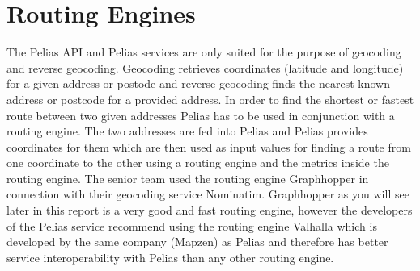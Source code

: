 
\section{Routing Engines}
The Pelias API and Pelias services are only suited for the purpose of geocoding and reverse geocoding. Geocoding retrieves coordinates (latitude and longitude) for a given address or postode and reverse geocoding finds the nearest known address or postcode for a provided address.
In order to find the shortest or fastest route between two given addresses Pelias has to be used in conjunction with a routing engine. The two addresses are fed into Pelias and Pelias provides coordinates for them which are then used as input values for finding a route from one coordinate to the other using a routing engine and the metrics inside the routing engine.
The senior team used the routing engine Graphhopper in connection with their geocoding service Nominatim. Graphhopper as you will see later in this report is a very good and fast routing engine, however the developers of the Pelias service recommend using the routing engine Valhalla which is developed by the same company (Mapzen) as Pelias and therefore has better service interoperability with Pelias than any other routing engine.
